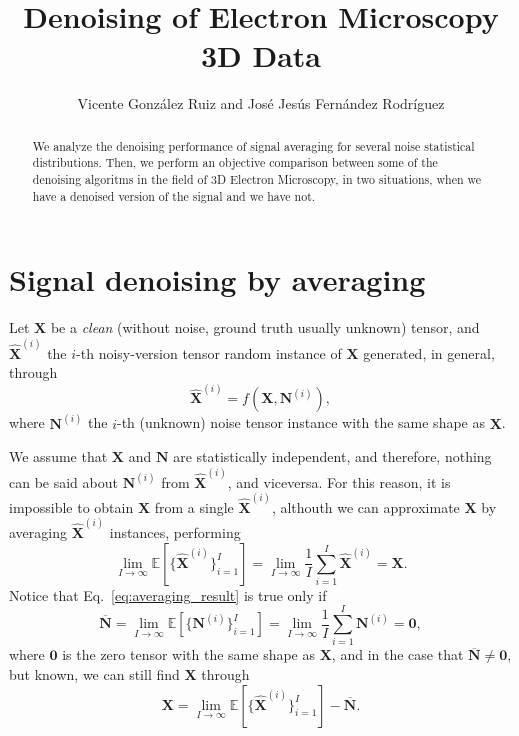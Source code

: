 \documentclass{article}
\title{Denoising of Electron Microscopy 3D Data}
\author{Vicente González Ruiz and José Jesús Fernández Rodríguez}
\begin{document}
\maketitle

\begin{abstract}
  We analyze the denoising performance of signal averaging for several
  noise statistical distributions. Then, we perform an objective
  comparison between some of the denoising algoritms in the field
  of 3D Electron Microscopy, in two situations, when we have a
  denoised version of the signal and we have not.
\end{abstract}

\section{Signal denoising by averaging}
Let $\mathbf{X}$ be a \emph{clean} (without noise, ground truth
usually unknown) tensor, and $\hat{\mathbf X}^{(i)}$ the $i$-th
noisy-version tensor random instance of $\mathbf{X}$ generated, in general, through
\begin{equation}
  \hat{\mathbf X}^{(i)} = f(\mathbf{X}, \mathbf{N}^{(i)}),
\end{equation}
where ${\mathbf N}^{(i)}$ the $i$-th (unknown) noise tensor instance
with the same shape as $\mathbf{X}$.

We assume that ${\mathbf X}$ and $\mathbf{N}$ are statistically
independent, and therefore, nothing can be said about
${\mathbf N}^{(i)}$ from $\hat{\mathbf X}^{(i)}$, and
viceversa. For this reason, it is impossible to obtain ${\mathbf X}$
from a single $\hat{\mathbf X}^{(i)}$, althouth we can approximate ${\mathbf X}$ by
averaging $\hat{\mathbf X}^{(i)}$ instances, performing
\begin{equation}
  \lim_{I \to \infty} \mathbb{E}\left[\{\hat{\mathbf X}^{(i)}\}_{i=1}^I\right] = \lim_{I \to \infty} \frac{1}{I} \sum_{i=1}^I \hat{\mathbf X}^{(i)} = {\mathbf X}.
  \label{eq:averaging_result}
\end{equation}
Notice that Eq.~\ref{eq:averaging_result} is true only if 
\begin{equation}
  \overline{\mathbf N} = \lim_{I \to \infty}{\mathbb E}[\{{\mathbf N^{(i)}}\}_{i=1}^I]=\lim_{I \to \infty}\frac{1}{I} \sum_{i=1}^I {\mathbf N}^{(i)}={\mathbf 0},
  \label{eq:noise_expectation_2}
\end{equation}
where ${\mathbf 0}$ is the zero tensor with the same shape as $\mathbf{X}$, and in the case that $\overline{\mathbf N}\ne {\mathbf 0}$, but known, we can still find ${\mathbf X}$ through
\begin{equation}
  {\mathbf X} = \lim_{I \to \infty} \mathbb{E}\left[\{\hat{\mathbf X}^{(i)}\}_{i=1}^I\right]  - \overline{\mathbf N}.
  \label{eq:averaging_result_with_bias}
\end{equation}
\end{document}
